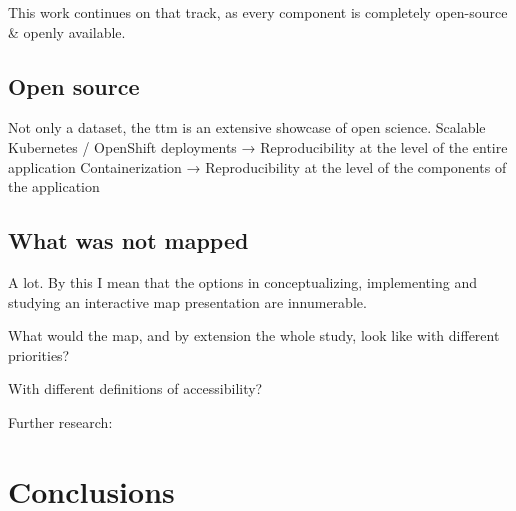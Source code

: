 This work continues on that track,
as every component is completely open-source \& openly available.

\subsection{Open source}
Not only a dataset, the \acrshort{ttm} is an extensive showcase of open science.
Scalable Kubernetes / OpenShift deployments → Reproducibility at the level of the entire application
Containerization → Reproducibility at the level of the components of the application

\subsection{What was not mapped}

A lot. By this I mean that the options in
conceptualizing, implementing and studying an interactive map presentation are innumerable.

What would the map, and by extension the whole study, look like with different priorities?

With different definitions of accessibility?

Further research:


\section{Conclusions}
